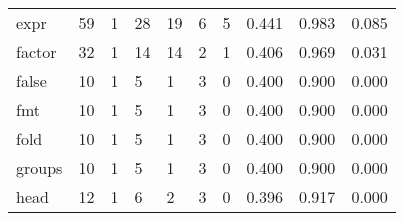 \begin{longtable}{lp{2.0cm}p{2.0cm}p{2.0cm}p{2.0cm}p{2.0cm}p{2.0cm}p{2.0cm}p{2.0cm}p{2.0cm}}
expr      &                     59 &                                             1 &                                           28 &                                          19 &                                            6 &                                          5 &                                0.441 &                                  0.983 &                                0.085 \\
factor    &                     32 &                                             1 &                                           14 &                                          14 &                                            2 &                                          1 &                                0.406 &                                  0.969 &                                0.031 \\
false     &                     10 &                                             1 &                                            5 &                                           1 &                                            3 &                                          0 &                                0.400 &                                  0.900 &                                0.000 \\
fmt       &                     10 &                                             1 &                                            5 &                                           1 &                                            3 &                                          0 &                                0.400 &                                  0.900 &                                0.000 \\
fold      &                     10 &                                             1 &                                            5 &                                           1 &                                            3 &                                          0 &                                0.400 &                                  0.900 &                                0.000 \\
groups    &                     10 &                                             1 &                                            5 &                                           1 &                                            3 &                                          0 &                                0.400 &                                  0.900 &                                0.000 \\
head      &                     12 &                                             1 &                                            6 &                                           2 &                                            3 &                                          0 &                                0.396 &                                  0.917 &                                0.000 \\

\end{longtable}
